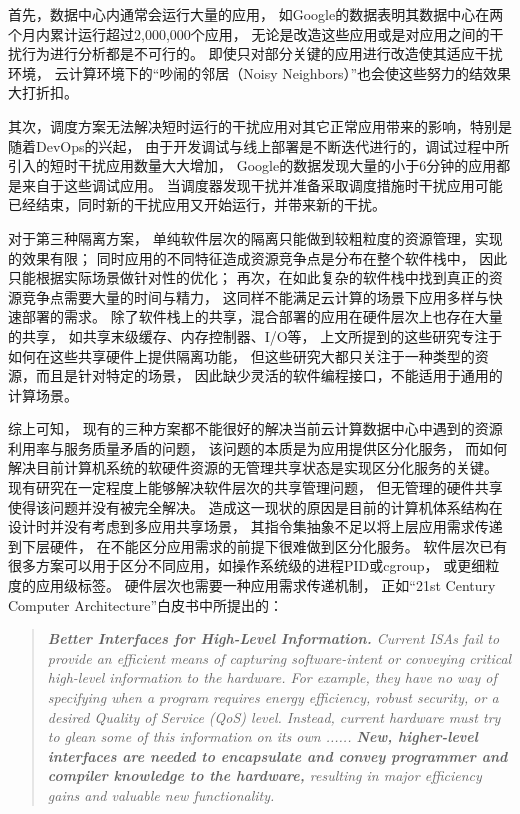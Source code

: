 首先，数据中心内通常会运行大量的应用，
如Google的数据\cite{Reiss_googletrace_2012}表明其数据中心在两个月内累计运行超过2,000,000个应用，
无论是改造这些应用或是对应用之间的干扰行为进行分析都是不可行的。
即使只对部分关键的应用进行改造使其适应干扰环境，
云计算环境下的``吵闹的邻居（Noisy Neighbors）''也会使这些努力的结效果大打折扣。

其次，调度方案无法解决短时运行的干扰应用对其它正常应用带来的影响，特别是随着DevOps的兴起，
由于开发调试与线上部署是不断迭代进行的，调试过程中所引入的短时干扰应用数量大大增加，
Google的数据\cite{Reiss_googletrace_2012}发现大量的小于6分钟的应用都是来自于这些调试应用。
当调度器发现干扰并准备采取调度措施时干扰应用可能已经结束，同时新的干扰应用又开始运行，并带来新的干扰。

对于第三种隔离方案，
单纯软件层次的隔离只能做到较粗粒度的资源管理，实现的效果有限；
同时应用的不同特征造成资源竞争点是分布在整个软件栈中，
因此只能根据实际场景做针对性的优化；
再次，在如此复杂的软件栈中找到真正的资源竞争点需要大量的时间与精力，
这同样不能满足云计算的场景下应用多样与快速部署的需求。
除了软件栈上的共享，混合部署的应用在硬件层次上也存在大量的共享，
如共享末级缓存、内存控制器、I/O等，
上文所提到的这些研究专注于如何在这些共享硬件上提供隔离功能，
但这些研究大都只关注于一种类型的资源，而且是针对特定的场景，
因此缺少灵活的软件编程接口，不能适用于通用的计算场景。

综上可知，
现有的三种方案都不能很好的解决当前云计算数据中心中遇到的资源利用率与服务质量矛盾的问题，
该问题的本质是为应用提供区分化服务，
而如何解决目前计算机系统的软硬件资源的无管理共享状态是实现区分化服务的关键。
现有研究在一定程度上能够解决软件层次的共享管理问题，
但无管理的硬件共享使得该问题并没有被完全解决。
造成这一现状的原因是目前的计算机体系结构在设计时并没有考虑到多应用共享场景，
其指令集抽象不足以将上层应用需求传递到下层硬件，
在不能区分应用需求的前提下很难做到区分化服务。
软件层次已有很多方案可以用于区分不同应用，如操作系统级的进程PID或cgroup，
或更细粒度的应用级标签\cite{timecard:2013,d2p:2014, mesnier_differentiated_2011}。
硬件层次也需要一种应用需求传递机制，
正如``21st Century Computer Architecture''白皮书中所提出的：

\begin{quotation} 
\emph{\textbf{Better Interfaces for High-Level Information.}
Current ISAs fail to provide an efficient means of capturing software-intent or conveying critical high-level information to the hardware.
For example, they have no way of specifying when a program requires energy efficiency, robust security, or a desired Quality of Service (QoS) level.
Instead, current hardware must try to glean some of this information on its own ......
\textbf{New, higher-level interfaces are needed to encapsulate and convey programmer and compiler knowledge to the hardware,}
resulting in major efficiency gains and valuable new functionality.}\cite{21st_architecture}
\end{quotation}

